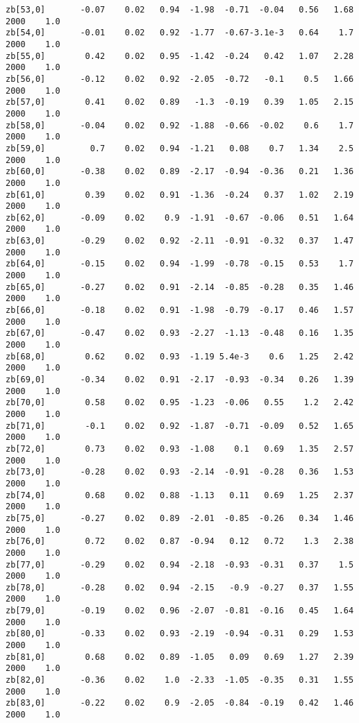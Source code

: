 \documentclass[11pt]{article}
\begin{document}
\begin{Verbatim}[commandchars=\\\{\}]
zb[53,0]       -0.07    0.02   0.94  -1.98  -0.71  -0.04   0.56   1.68   2000    1.0
zb[54,0]       -0.01    0.02   0.92  -1.77  -0.67-3.1e-3   0.64    1.7   2000    1.0
zb[55,0]        0.42    0.02   0.95  -1.42  -0.24   0.42   1.07   2.28   2000    1.0
zb[56,0]       -0.12    0.02   0.92  -2.05  -0.72   -0.1    0.5   1.66   2000    1.0
zb[57,0]        0.41    0.02   0.89   -1.3  -0.19   0.39   1.05   2.15   2000    1.0
zb[58,0]       -0.04    0.02   0.92  -1.88  -0.66  -0.02    0.6    1.7   2000    1.0
zb[59,0]         0.7    0.02   0.94  -1.21   0.08    0.7   1.34    2.5   2000    1.0
zb[60,0]       -0.38    0.02   0.89  -2.17  -0.94  -0.36   0.21   1.36   2000    1.0
zb[61,0]        0.39    0.02   0.91  -1.36  -0.24   0.37   1.02   2.19   2000    1.0
zb[62,0]       -0.09    0.02    0.9  -1.91  -0.67  -0.06   0.51   1.64   2000    1.0
zb[63,0]       -0.29    0.02   0.92  -2.11  -0.91  -0.32   0.37   1.47   2000    1.0
zb[64,0]       -0.15    0.02   0.94  -1.99  -0.78  -0.15   0.53    1.7   2000    1.0
zb[65,0]       -0.27    0.02   0.91  -2.14  -0.85  -0.28   0.35   1.46   2000    1.0
zb[66,0]       -0.18    0.02   0.91  -1.98  -0.79  -0.17   0.46   1.57   2000    1.0
zb[67,0]       -0.47    0.02   0.93  -2.27  -1.13  -0.48   0.16   1.35   2000    1.0
zb[68,0]        0.62    0.02   0.93  -1.19 5.4e-3    0.6   1.25   2.42   2000    1.0
zb[69,0]       -0.34    0.02   0.91  -2.17  -0.93  -0.34   0.26   1.39   2000    1.0
zb[70,0]        0.58    0.02   0.95  -1.23  -0.06   0.55    1.2   2.42   2000    1.0
zb[71,0]        -0.1    0.02   0.92  -1.87  -0.71  -0.09   0.52   1.65   2000    1.0
zb[72,0]        0.73    0.02   0.93  -1.08    0.1   0.69   1.35   2.57   2000    1.0
zb[73,0]       -0.28    0.02   0.93  -2.14  -0.91  -0.28   0.36   1.53   2000    1.0
zb[74,0]        0.68    0.02   0.88  -1.13   0.11   0.69   1.25   2.37   2000    1.0
zb[75,0]       -0.27    0.02   0.89  -2.01  -0.85  -0.26   0.34   1.46   2000    1.0
zb[76,0]        0.72    0.02   0.87  -0.94   0.12   0.72    1.3   2.38   2000    1.0
zb[77,0]       -0.29    0.02   0.94  -2.18  -0.93  -0.31   0.37    1.5   2000    1.0
zb[78,0]       -0.28    0.02   0.94  -2.15   -0.9  -0.27   0.37   1.55   2000    1.0
zb[79,0]       -0.19    0.02   0.96  -2.07  -0.81  -0.16   0.45   1.64   2000    1.0
zb[80,0]       -0.33    0.02   0.93  -2.19  -0.94  -0.31   0.29   1.53   2000    1.0
zb[81,0]        0.68    0.02   0.89  -1.05   0.09   0.69   1.27   2.39   2000    1.0
zb[82,0]       -0.36    0.02    1.0  -2.33  -1.05  -0.35   0.31   1.55   2000    1.0
zb[83,0]       -0.22    0.02    0.9  -2.05  -0.84  -0.19   0.42   1.46   2000    1.0

\end{Verbatim}
\end{document}
